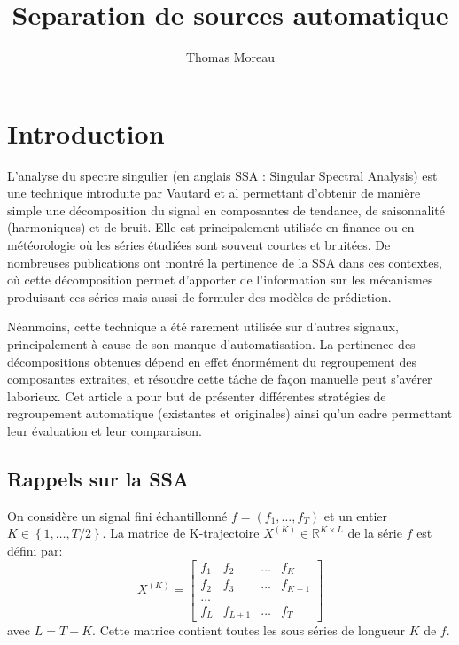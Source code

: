 \documentclass{gretsi}
\title{Separation de sources automatique}
\author{Thomas Moreau}
\date{}
\newcommand{\R}{\mathbb R}
\newcommand{\val}[3]{(#1_1 #3 \dots #3 #1_#2)}
\begin{document}
\maketitle


\section{Introduction}

L'analyse du spectre singulier (en anglais SSA : Singular Spectral Analysis) est une technique introduite par Vautard et al \cite{vautard_ghil_89_SSA} permettant d'obtenir de manière simple une décomposition du signal en composantes de tendance, de saisonnalité (harmoniques) et de bruit. Elle est principalement utilisée en finance ou en météorologie où les séries étudiées sont souvent courtes et bruitées. De nombreuses publications ont montré la pertinence de la SSA dans ces contextes, où cette décomposition permet d'apporter de l'information sur les mécanismes produisant ces séries mais aussi de formuler des modèles de prédiction.


Néanmoins, cette technique a été rarement utilisée sur d'autres signaux, principalement à cause de son manque d'automatisation. La pertinence des décompositions obtenues dépend en effet énormément du regroupement des composantes extraites, et résoudre cette tâche de façon manuelle peut s'avérer laborieux. Cet article a pour but de présenter différentes stratégies de regroupement automatique (existantes et originales) ainsi qu'un cadre permettant leur évaluation et leur comparaison.





\subsection{Rappels sur la SSA}
On considère un signal fini échantillonné $f = \val{f}{T}{,}$ et un entier $K \in \left \{ 1, \dots, T/2 \right \}$. La matrice de K-trajectoire $X^{(K)} \in \R^{K\times L}$ de la série $f$ est défini par:
$$ X^{(K)} = \begin{bmatrix}
	f_1 & f_2 &\dots & f_K\\
	f_2 & f_3 &\dots & f_{K+1}\\
	\dots\\
	f_{L} & f_{L+1} &\dots & f_T
\end{bmatrix}$$ avec $L = T-K$. Cette matrice contient toutes les sous séries de longueur $K$ de $f$.
\end{document}
